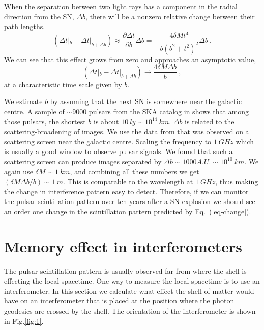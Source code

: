 \documentclass[aps,showpacs,onecolumn,floats,prd,superscriptaddress,nofootinbib]{revtex4-1}
\begin{document}
When the separation between two light rays has a component in the radial direction from the SN, $\Delta b$, there will be a nonzero relative change between their path lengths.
\begin{equation}
	(\Delta t|_b - \Delta t|_{b+\Delta b}) \approx 
	\frac{\partial \Delta t}{\partial b} \Delta b 
	= - \frac{4\delta Mt^4}{b(b^2 + t^2)^2} \Delta b~.
	\label{eq-change}
\end{equation}
We can see that this effect grows from zero and approaches an asymptotic value,
\begin{equation}
	(\Delta t|_b - \Delta t|_{b+\Delta b}) 
	\longrightarrow \frac{4\delta M \Delta b}{b}~,	\label{pulsescint}
\end{equation}
at a characteristic time scale given by $b$.

We estimate $b$ by assuming that the next SN is somewhere near the galactic centre. A sample of $\sim 9000$ pulsars from the SKA catalog in \cite{MSPpopulation} shows that among those pulsars, the shortest $b$ is about $10\ ly \sim 10^{14} \ km$. $\Delta b$ is related to the scattering-broadening of images. We use the data from \cite{BowBel13} that was observed on a scattering screen near the galactic centre. Scaling the frequency to $1\ GHz$ which is usually a good window to observe pulsar signals. We found that such a scattering screen can produce images separated by $\Delta b\sim 1000A.U. \sim 10^{10} \ km$. We again use $\delta M \sim 1 \ km$, and combining all these numbers we get $(\delta M \Delta b / b) \sim 1 \ m$. This is comparable to the wavelength at $1 \ GHz$, thus making the change in interference pattern easy to detect. Therefore, if we can monitor the pulsar scintillation pattern over ten years after a SN explosion we should see an order one change in the scintillation pattern predicted by Eq.~(\ref{eq-change}). 

\section{Memory effect in interferometers}
\label{RelV}

The pulsar scintillation pattern is usually observed far from where the shell is effecting the local spacetime. One way to measure the local spacetime is to use an interferometer. In this section we calculate what effect the shell of matter would have on an interferometer that is placed at the position where the photon geodesics are crossed by the shell.
The orientation of the interferometer is shown in Fig.\ref{fig:1}.
\end{document}
